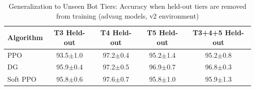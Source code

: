 \begin{table}[h]
\centering
\caption{Generalization to Unseen Bot Tiers: Accuracy when held-out tiers are removed from training (advaug models, v2 environment)}
\label{tab:heldout_tiers}
\begin{tabular}{lcccc}
\toprule
Algorithm & T3 Held-out & T4 Held-out & T5 Held-out & T3+4+5 Held-out \\
\midrule
  PPO & 93.5$\pm$1.0 & 97.2$\pm$0.4 & 95.2$\pm$1.4 & 95.2$\pm$0.8 \\
  DG & 95.9$\pm$0.4 & 97.2$\pm$0.5 & 96.9$\pm$0.7 & 96.8$\pm$0.3 \\
  Soft PPO & 95.8$\pm$0.6 & 97.6$\pm$0.7 & 95.8$\pm$1.0 & 95.9$\pm$1.3 \\
\bottomrule
\end{tabular}
\end{table}